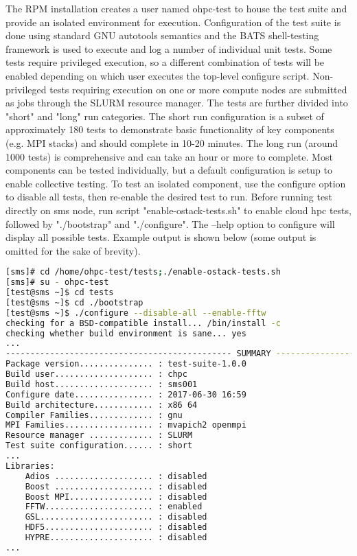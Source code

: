 The RPM installation creates a user named ohpc-test to house the test suite and provide an isolated environment for execution. Configuration of the test suite is done using standard GNU autotools semantics and the BATS shell-testing framework is used to execute and log a number of individual unit tests. Some tests require privileged execution, so a different combination of tests will be enabled depending on which user executes the top-level configure script. Non-privileged tests requiring execution on one or more compute nodes are submitted as jobs through the SLURM resource manager. The tests are further divided into "short" and "long" run categories. The short run configuration is a subset of approximately 180 tests to demonstrate basic functionality of key components (e.g. MPI stacks) and should complete in 10-20 minutes. The long run (around 1000 tests) is comprehensive and can take an hour or more to complete. Most components can be tested individually, but a default configuration is setup to enable collective testing. To test an isolated component, use the configure option to disable all tests, then re-enable the desired test to run. Before running test directly on sms node, run script "enable-ostack-tests.sh" to enable cloud hpc tests, followed by "./bootstrap" and "./configure". The --help option to configure will display all possible tests. Example output is shown below (some output is omitted for the sake of brevity).
\begin{lstlisting}[language=bash,keywords={},upquote=true]
[sms]# cd /home/ohpc-test/tests;./enable-ostack-tests.sh 
[sms]# su - ohpc-test
[test@sms ~]$ cd tests 
[test@sms ~]$ cd ./bootstrap
[test@sms ~]$ ./configure --disable-all --enable-fftw 
checking for a BSD-compatible install... /bin/install -c 
checking whether build environment is sane... yes 
... 
---------------------------------------------- SUMMARY --------------------------------------------
Package version............... : test-suite-1.0.0
Build user.................... : chpc
Build host.................... : sms001 
Configure date................ : 2017-06-30 16:59
Build architecture............ : x86 64 
Compiler Families............. : gnu 
MPI Families.................. : mvapich2 openmpi 
Resource manager ............. : SLURM 
Test suite configuration...... : short 
... 
Libraries: 
	Adios .................... : disabled 
	Boost .................... : disabled 
	Boost MPI................. : disabled 
	FFTW...................... : enabled 
	GSL....................... : disabled 
	HDF5...................... : disabled 
	HYPRE..................... : disabled 
...
\end{lstlisting}
	
